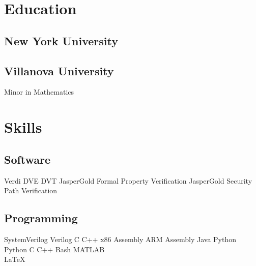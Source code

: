 \documentclass[]{detrano_resume}
\begin{document}
%
%


%
%

\begin{minipage}[t]{0.3\textwidth} 
	
	
	\section{Education} 
	
	\subsection{New York University}
	\sectionsep
	
	\subsection{Villanova University}
	Minor in Mathematics \\
	\sectionsep
	
	
	\section{Skills}
	\subsection{Software}
	Verdi \textbullet{} DVE \textbullet{} DVT\textbullet{} JasperGold Formal Property Verification \textbullet{} JasperGold Security Path Verification
	\sectionsep
	
	\subsection{Programming}
	SystemVerilog \textbullet{}
	Verilog \textbullet{}
	C \textbullet{} 
	C++ \textbullet{}
	x86 Assembly \textbullet{} 
	ARM Assembly \textbullet{}
	Java \textbullet{} 
	Python
	\\ 
	\vspace{5pt}
	Python \textbullet{}
	C \textbullet{}
	C++ \textbullet{}
	Bash \textbullet{}
	MATLAB 
	\\
	\LaTeX\
	\sectionsep
\end{minipage} 
\end{document}
